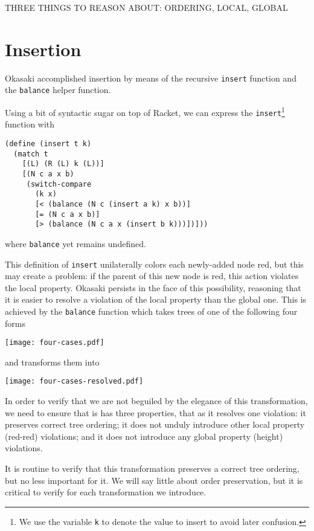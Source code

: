 \documentclass[preprint]{sigplanconf}
\begin{document}
THREE THINGS TO REASON ABOUT: ORDERING, LOCAL, GLOBAL

\section{Insertion}

Okasaki \cite{okasaki1999functional} accomplished insertion by means of the recursive \texttt{insert} function and the \texttt{balance} helper function.

Using a bit of syntactic sugar on top of Racket, we can express the \texttt{insert}\footnote{We use the variable \texttt{k} to denote the value to insert to avoid later confusion.} function with
\begin{verbatim}
(define (insert t k)
  (match t
    [(L) (R (L) k (L))]
    [(N c a x b)
     (switch-compare
       (k x)
       [< (balance (N c (insert a k) x b))]
       [= (N c a x b)]
       [> (balance (N c a x (insert b k)))])]))
\end{verbatim}
where \texttt{balance} yet remains undefined.

This definition of \texttt{insert} unilaterally colors each newly-added node red, but this may create a problem: if the parent of this new node is red, this action violates the local property. Okasaki persists in the face of this possibility, reasoning that it is easier to resolve a violation of the local property than the global one. This is achieved by the \texttt{balance} function which takes trees of one of the following four forms
\begin{center}
\texttt{[image: four-cases.pdf]}
\end{center}
and transforms them into
\begin{center}
\texttt{[image: four-cases-resolved.pdf]}
\end{center}

In order to verify that we are not beguiled by the elegance of this transformation, we need to ensure that is has three properties, that as it resolves one violation: it preserves correct tree ordering; it does not unduly introduce other local property (red-red) violations; and it does not introduce any global property (height) violations.

It is routine to verify that this transformation preserves a correct tree ordering, but no less important for it. We will say little about order preservation, but it is critical to verify for each transformation we introduce.
\end{document}
